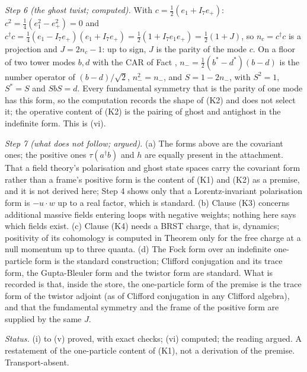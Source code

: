 \emph{Step 6 (the ghost twist; computed).} With $c = \tfrac12(e_{1} + I_{7}e_{+})$: $c^{2} = \tfrac14(e_{1}^{2} - e_{+}^{2}) = 0$ and $c^{\dagger}c = \tfrac14(e_{1} - I_{7}e_{+})(e_{1} + I_{7}e_{+}) = \tfrac12(1 + I_{7}e_{1}e_{+}) = \tfrac12(1 + J)$, so $n_{c} = c^{\dagger}c$ is a projection and $J = 2n_{c} - 1$: up to sign, $J$ is the parity of the mode $c$. On a floor of two tower modes $b, d$ with the CAR of Fact , $n_{-} = \tfrac12(b^{*} - d^{*})(b - d)$ is the number operator of $(b - d)/\sqrt2$, $n_{-}^{2} = n_{-}$, and $S = 1 - 2n_{-}$, with $S^{2} = 1$, $S^{*} = S$ and $SbS = d$. Every fundamental symmetry that is the parity of one mode has this form, so the computation records the shape of (K2) and does not select it; the operative content of (K2) is the pairing of ghost and antighost in the indefinite form. This is (vi).

\emph{Step 7 (what does not follow; argued).} (a) The forms above are the covariant ones; the positive ones $\tau(a^{\dagger}b)$ and $h$ are equally present in the attachment. That a field theory's polarisation and ghost state spaces carry the covariant form rather than a frame's positive form is the content of (K1) and (K2) as a premise, and it is not derived here; Step 4 shows only that a Lorentz-invariant polarisation form is $-u\cdot w$ up to a real factor, which is standard. (b) Clause (K3) concerns additional massive fields entering loops with negative weights; nothing here says which fields exist. (c) Clause (K4) needs a BRST charge, that is, dynamics; positivity of its cohomology is computed in Theorem  only for the free charge at a null momentum up to three quanta. (d) The Fock form over an indefinite one-particle form is the standard construction; Clifford conjugation and its trace form, the Gupta-Bleuler form and the twistor form are standard. What is recorded is that, inside the store, the one-particle form of the premise is the trace form of the twistor adjoint (as of Clifford conjugation in any Clifford algebra), and that the fundamental symmetry and the frame of the positive form are supplied by the same $J$.

\emph{Status.} (i) to (v) proved, with exact checks; (vi) computed; the reading argued. A restatement of the one-particle content of (K1), not a derivation of the premise. Transport-absent.
